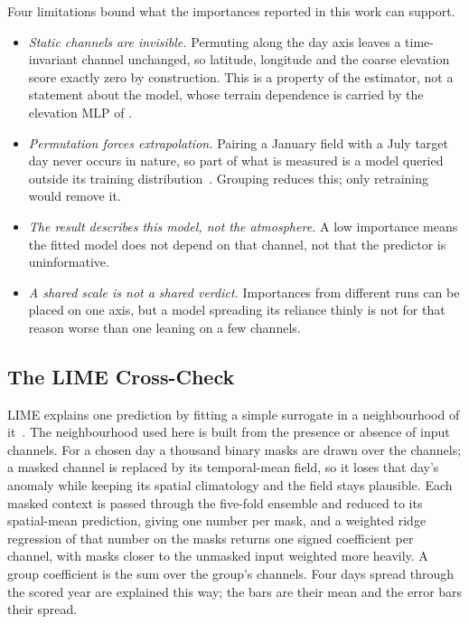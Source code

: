 Four limitations bound what the importances reported in this work can support.
\begin{itemize}
\item \emph{Static channels are invisible.} Permuting along the day axis leaves a time-invariant
channel unchanged, so latitude, longitude and the coarse elevation score exactly zero by
construction. This is a property of the estimator, not a statement about the model, whose terrain
dependence is carried by the elevation MLP of .
\item \emph{Permutation forces extrapolation.} Pairing a January field with a July target day never
occurs in nature, so part of what is measured is a model queried outside its training
distribution~\cite{hooker2021unrestricted}. Grouping reduces this; only retraining would remove it.
\item \emph{The result describes this model, not the atmosphere.} A low importance means the fitted
model does not depend on that channel, not that the predictor is uninformative.
\item \emph{A shared scale is not a shared verdict.} Importances from different runs can be placed
on one axis, but a model spreading its reliance thinly is not for that reason worse than one leaning
on a few channels.
\end{itemize}

\subsection{The LIME Cross-Check}\label{subsec:app-fi-lime}

LIME explains one prediction by fitting a simple surrogate in a neighbourhood of
it~\cite{ribeiro2016lime}. The neighbourhood used here is built from the presence or absence of
input channels. For a chosen day a thousand binary masks are drawn over the channels; a masked
channel is replaced by its temporal-mean field, so it loses that day's anomaly while keeping its
spatial climatology and the field stays plausible. Each masked context is passed through the
five-fold ensemble and reduced to its spatial-mean prediction, giving one number per mask, and a
weighted ridge regression of that number on the masks returns one signed coefficient per channel,
with masks closer to the unmasked input weighted more heavily. A group coefficient is the sum over
the group's channels. Four days spread through the scored year are explained this way; the bars are
their mean and the error bars their spread.

